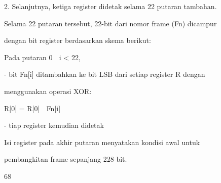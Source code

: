 \documentclass{article}
\begin{document}

2. Selanjutnya, ketiga register didetak selama 22 putaran tambahan. 

Selama 22 putaran tersebut, 22-bit dari nomor frame (Fn) dicampur 

dengan bit register berdasarkan skema berikut: 


Pada putaran 0  i < 22, 

                - bit Fn[i] ditambahkan ke bit LSB dari setiap register R dengan 

menggunakan operasi XOR:



R[0] = R[0]  Fn[i]

              - tiap register kemudian didetak


     Isi register pada akhir putaran menyatakan kondisi awal untuk    

     pembangkitan frame  sepanjang 228-bit. 

68
\end{document}
